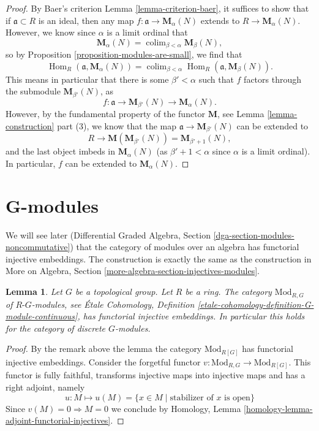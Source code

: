 \documentclass{stacks-project}
\theoremstyle{plain}
\newtheorem{lemma}[subsection]{Lemma}
\theoremstyle{definition}
\theoremstyle{remark}
\numberwithin{equation}{subsection}
\def\colim{\mathop{\mathrm{colim}}\nolimits}
\def\Hom{\mathop{\mathrm{Hom}}\nolimits}
\begin{document}
\begin{proof}
By Baer's criterion
Lemma \ref{lemma-criterion-baer},
it suffices to show that if $\mathfrak{a} \subset R$ is an ideal, then
any map $f : \mathfrak{a} \to \mathbf{M}_\alpha(N)$ extends to
$R \to \mathbf{M}_\alpha(N)$. However, we know since $\alpha$ is a limit
ordinal that
$$
\mathbf{M}_{\alpha}(N) =
\colim_{\beta < \alpha} \mathbf{M}_{\beta}(N),
$$
so by
Proposition \ref{proposition-modules-are-small},
we find that
$$
\Hom_R(\mathfrak{a}, \mathbf{M}_{\alpha}(N)) =
\colim_{\beta < \alpha} \Hom_R(\mathfrak a, \mathbf{M}_{\beta}(N)).
$$
This means in particular that there is some $\beta' < \alpha$
such that $f$ factors through the submodule $\mathbf{M}_{\beta'}(N)$, as
$$
f : \mathfrak{a} \to \mathbf{M}_{\beta'}(N) \to
\mathbf{M}_{\alpha}(N).
$$
However, by the fundamental property of the functor $\mathbf{M}$,
see Lemma \ref{lemma-construction} part (3),
we know that the map $\mathfrak{a} \to \mathbf{M}_{\beta'}(N)$
can be extended to
$$
R \to \mathbf{M}( \mathbf{M}_{\beta'}(N)) =
\mathbf{M}_{\beta' + 1}(N),
$$
and the last object imbeds in $\mathbf{M}_{\alpha}(N)$ (as
$\beta' + 1 < \alpha$ since $\alpha$ is a limit ordinal).
In particular, $f$ can be extended to $\mathbf{M}_{\alpha}(N)$.
\end{proof}




\section{G-modules}
\label{section-G-modules}

\noindent
We will see later
(Differential Graded Algebra, Section \ref{dga-section-modules-noncommutative})
that the category of modules over an algebra has
functorial injective embeddings. The construction is exactly the same
as the construction in
More on Algebra, Section \ref{more-algebra-section-injectives-modules}.

\begin{lemma}
\label{lemma-G-modules}
Let $G$ be a topological group. Let $R$ be a ring.
The category $\text{Mod}_{R, G}$ of $R\text{-}G$-modules, see
\'Etale Cohomology, Definition
\ref{etale-cohomology-definition-G-module-continuous},
has functorial injective embeddings. In particular this holds
for the category of discrete $G$-modules.
\end{lemma}

\begin{proof}
By the remark above the lemma the category $\text{Mod}_{R[G]}$
has functorial injective embeddings.
Consider the forgetful functor
$v : \text{Mod}_{R, G} \to \text{Mod}_{R[G]}$.
This functor is fully faithful, transforms injective maps into
injective maps and has a right adjoint, namely
$$
u : M \mapsto u(M) = \{x \in M \mid \text{stabilizer of }x\text{ is open}\}
$$
Since $v(M) = 0 \Rightarrow M = 0$ we conclude by
Homology, Lemma \ref{homology-lemma-adjoint-functorial-injectives}.
\end{proof}
\end{document}
